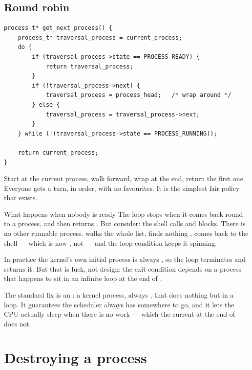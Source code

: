 \subsection{Round robin}

\begin{lstlisting}[style=c]
process_t* get_next_process() {
    process_t* traversal_process = current_process;
    do {
        if (traversal_process->state == PROCESS_READY) {
            return traversal_process;
        }
        if (!traversal_process->next) {
            traversal_process = process_head;   /* wrap around */
        } else {
            traversal_process = traversal_process->next;
        }
    } while (!(traversal_process->state == PROCESS_RUNNING));

    return current_process;
}
\end{lstlisting}

Start at the current process, walk forward, wrap at the end, return the first  one.
Everyone gets a turn, in order, with no favourites. It is the simplest fair policy that exists.

\begin{danger}{What happens when nobody is ready}
The loop stops when it comes back round to a  process, and then returns
. But consider: the shell calls  and blocks. There is no other
runnable process.  walks the whole list, finds nothing , comes
back to the shell --- which is now , not  --- and the loop condition
 keeps it spinning.

In practice the kernel's own initial process is always , so the loop terminates and
returns it. But that is luck, not design: the exit condition depends on a process that happens to
sit in an infinite loop at the end of .

The standard fix is an : a kernel process, always , that does
nothing but  in a loop. It guarantees the scheduler always has somewhere to go, and it
lets the CPU actually sleep when there is no work --- which the current  at the end of
 does not.
\end{danger}

\section{Destroying a process}

